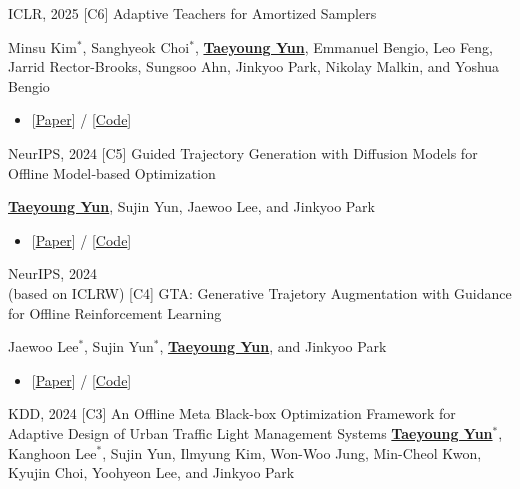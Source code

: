 \documentclass[10pt]{developercv} %
\begin{document}
\begin{entrylist}
{\begin{itemize}[noitemsep,topsep=2pt,parsep=2pt,partopsep=0pt, leftmargin=0pt]
        \end{itemize}
        }
    \vspace{-3pt}
    \entry
        {ICLR, 2025}
        {[C6] Adaptive Teachers for Amortized Samplers}
        {}
        {Minsu Kim$^*$, Sanghyeok Choi$^*$, \underline{\textbf{Taeyoung Yun}}, Emmanuel Bengio, Leo Feng, Jarrid Rector-Brooks, Sungsoo Ahn, Jinkyoo Park, Nikolay Malkin, and Yoshua Bengio
        \begin{itemize}[noitemsep,topsep=2pt,parsep=2pt,partopsep=0pt, leftmargin=0pt]
            \item[]{[\href{https://arxiv.org/abs/2410.01432}{Paper}] / [\href{https://github.com/alstn12088/adaptive-teacher}{Code}]}
        \end{itemize}
        }
    \entry
        {NeurIPS, 2024}
        {[C5] Guided Trajectory Generation with Diffusion Models for Offline Model‑based Optimization}
        {}
        {\underline{\textbf{Taeyoung Yun}}, Sujin Yun, Jaewoo Lee, and Jinkyoo Park
        \begin{itemize}[noitemsep,topsep=2pt,parsep=2pt,partopsep=0pt, leftmargin=0pt]
            \item[]{[\href{https://openreview.net/forum?id=ioKQzb8SMr}{Paper}] / [\href{https://github.com/dbsxodud-11/GTG}{Code}]}
        \end{itemize}
        }
    \vspace{-3pt}
    \entry
        {NeurIPS, 2024 \\(based on ICLRW)}
        {[C4] GTA: Generative Trajetory Augmentation with Guidance for Offline Reinforcement Learning}
        {}
        {Jaewoo Lee$^*$, Sujin Yun$^*$, \underline{\textbf{Taeyoung Yun}}, and Jinkyoo Park
        \begin{itemize}[noitemsep,topsep=2pt,parsep=2pt,partopsep=0pt, leftmargin=0pt]
            \item[]{[\href{https://openreview.net/forum?id=kZpNDbZrzy}{Paper}] / [\href{https://github.com/Jaewoopudding/GTA}{Code}]}
        \end{itemize}
        }
    \vspace{-3pt}
    \entry
        {KDD, 2024}
        {[C3] An Offline Meta Black-box Optimization Framework for Adaptive Design of Urban Traffic Light Management Systems}
        {}
        {\underline{\textbf{Taeyoung Yun$^{*}$}},  Kanghoon Lee$^{*}$, Sujin Yun, Ilmyung Kim, Won-Woo Jung, Min-Cheol Kwon, Kyujin Choi, Yoohyeon Lee, and Jinkyoo Park
}
\end{entrylist}
\end{document}
